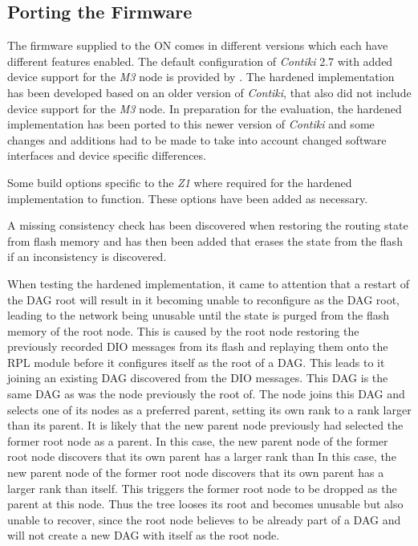 \subsection{Porting the Firmware}

The firmware supplied to the \ac{ON} comes in different versions which each have
different features enabled. The default configuration of \emph{Contiki} 2.7 with
added device support for the \emph{M3} node is provided by \fitlab. The hardened
implementation has been developed based on an older version of \emph{Contiki}, that
also did not include device support for the \emph{M3} node. In preparation for
the evaluation, the hardened implementation has been ported to this newer version
of \emph{Contiki} and some changes and additions had to be made to take into
account changed software interfaces and device specific differences.

Some build options specific to the \emph{Z1} where required for the hardened
implementation to function. These options have been added as necessary.

A missing consistency check has been discovered when restoring the routing state
from flash memory and has then been added that erases the state from the flash
if an inconsistency is discovered.

When testing the hardened implementation, it came to attention that a restart of
the \ac{DAG} root will result in it becoming unable to reconfigure as the
\ac{DAG} root, leading to the network being unusable until the state is purged
from the flash memory of the root node. This is caused by the root node
restoring the previously recorded \ac{DIO} messages from its flash and replaying
them onto the \ac{RPL} module before it configures itself as the root of a
\ac{DAG}. This leads to it joining an existing \ac{DAG} discovered from the
\ac{DIO} messages. This \ac{DAG} is the same \ac{DAG} as was the node previously
the root of. The node joins this \ac{DAG} and selects one of its nodes as a
preferred parent, setting its own rank to a rank larger than its parent. It is
likely that the new parent node previously had selected the former root node as
a parent. In this case, the new parent node of the former root node discovers
that its own parent has a larger rank than In this case, the new parent node of
the former root node discovers that its own parent has a larger rank than
itself. This triggers the former root node to be dropped as the parent at this
node. Thus the tree looses its root and becomes unusable but also unable to
recover, since the root node believes to be already part of a \ac{DAG} and will
not create a new \ac{DAG} with itself as the root node.

